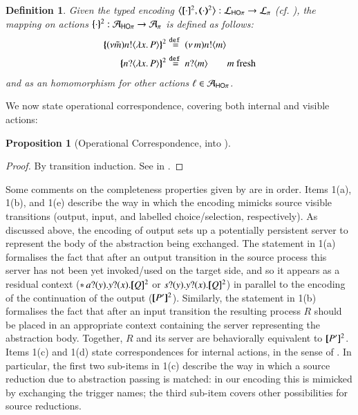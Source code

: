 \documentclass[preprint,11pt]{elsarticle}
\newtheorem{definition}{Definition}[section]
\newtheorem{proposition}{Proposition}[section]
\begin{document}
{%
\begin{definition}%
\label{d:actmap2}
Given the typed encoding 
$\enco{\map{\cdot}^{2}, \mapt{\cdot}^{2} %
}: \tyl{L}_{\HOp} \to \tyl{L}_{\sessp}$  (cf. ), 
the mapping on actions $\{\!\!\{\cdot\}\!\!\}^{2}: \mathcal{A}_{\mathsf{HO}\pi} \to \mathcal{A}_{\pi}$ is defined as follows:
	\begin{align*}
		\mapa{(\nu \tilde{m})\bactout{n}{\abs{ x}{P}} }^{2} & \defeq \news{m} \bactout{n}{m}
		\\
		\mapa{\bactinp{n}{\abs{ x}{P}} }^{2} & \defeq \bactinp{n}{m} \quad \quad m \text{ fresh}
	\end{align*}
	and as an homomorphism for other actions $\ell \in \mathcal{A}_{\mathsf{HO}\pi}$.
\end{definition}

We now state operational correspondence, covering both internal and visible actions:

\begin{proposition}[Operational Correspondence, \HOp into \sessp]\myrm
	\label{prop:op_corr_HOp_to_p}
	
	\end{proposition}

\begin{proof}
	\noi By transition induction.
	See  in 
	.
\end{proof}

Some comments on the completeness properties given by  are in order. Items 1(a), 1(b), and 1(e) describe the way in which 
the encoding mimicks source visible transitions (output, input, and labelled choice/selection, respectively). 
As discussed above, the encoding of output 
sets up a potentially persistent server to represent the body of the abstraction being exchanged. 
The statement in 1(a) formalises the fact that 
after an output transition in the source process this server has not been yet invoked/used on the target side, and so it appears as a
residual context ($\ast\,{} a ? (y) . y ? (x) . [\!\![Q]\!\!]^2$ or $s ? (y) . y ? (x) . [\!\![Q]\!\!]^2$)
in parallel to the encoding of the continuation of the output ($[\!\![P']\!\!]^2$).
Similarly, the statement in 1(b) formalises the fact that after an input transition the resulting process $R$ should be 
placed in an appropriate context containing the server representing the abstraction body. 
Together, $R$ and its server are behaviorally equivalent to $[\!\![P']\!\!]^2$.
Items 1(c) and 1(d) state correspondences for internal actions, in the sense of .
In particular, the first two sub-items in 1(c) describe the way in which a source reduction due to abstraction passing is matched: in our encoding
this is mimicked by exchanging the trigger names; the third sub-item covers other possibilities for source reductions. 

}
\end{document}
